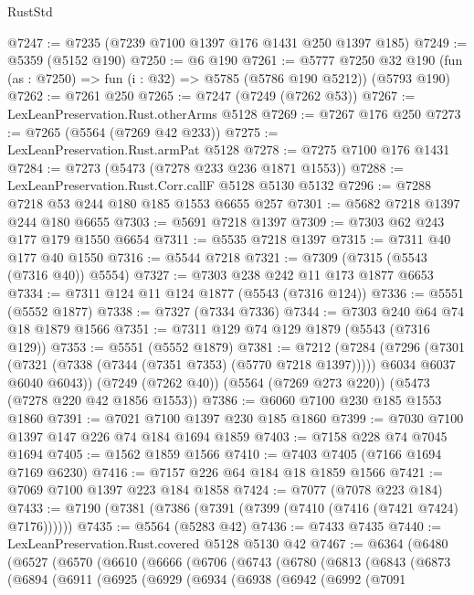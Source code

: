\begin{lexlean}{RustStd}
\begin{coremodule}
@7247 := @7235 (@7239 @7100 @1397 @176 @1431 @250 @1397 @185)
@7249 := @5359 (@5152 @190)
@7250 := @6 @190
@7261 := @5777
    @7250
    @32
    @190
    (fun (as : @7250) => fun (i : @32) => @5785 (@5786 @190 @5212))
    (@5793 @190)
@7262 := @7261 @250
@7265 := @7247 (@7249 (@7262 @53))
@7267 := LexLeanPreservation.Rust.otherArms @5128
@7269 := @7267 @176 @250
@7273 := @7265 (@5564 (@7269 @42 @233))
@7275 := LexLeanPreservation.Rust.armPat @5128
@7278 := @7275 @7100 @176 @1431
@7284 := @7273 (@5473 (@7278 @233 @236 @1871 @1553))
@7288 := LexLeanPreservation.Rust.Corr.callF @5128 @5130 @5132
@7296 := @7288 @7218 @53 @244 @180 @185 @1553 @6655 @257
@7301 := @5682 @7218 @1397 @244 @180 @6655
@7303 := @5691 @7218 @1397
@7309 := @7303 @62 @243 @177 @179 @1550 @6654
@7311 := @5535 @7218 @1397
@7315 := @7311 @40 @177 @40 @1550
@7316 := @5544 @7218
@7321 := @7309 (@7315 (@5543 (@7316 @40)) @5554)
@7327 := @7303 @238 @242 @11 @173 @1877 @6653
@7334 := @7311 @124 @11 @124 @1877 (@5543 (@7316 @124))
@7336 := @5551 (@5552 @1877)
@7338 := @7327 (@7334 @7336)
@7344 := @7303 @240 @64 @74 @18 @1879 @1566
@7351 := @7311 @129 @74 @129 @1879 (@5543 (@7316 @129))
@7353 := @5551 (@5552 @1879)
@7381 := @7212
    (@7284
      (@7296
        (@7301 (@7321 (@7338 (@7344 (@7351 @7353) (@5770 @7218 @1397)))))
        @6034
        @6037
        @6040
        @6043))
    (@7249 (@7262 @40))
    (@5564 (@7269 @273 @220))
    (@5473 (@7278 @220 @42 @1856 @1553))
@7386 := @6060 @7100 @230 @185 @1553 @1860
@7391 := @7021 @7100 @1397 @230 @185 @1860
@7399 := @7030 @7100 @1397 @147 @226 @74 @184 @1694 @1859
@7403 := @7158 @228 @74 @7045 @1694
@7405 := @1562 @1859 @1566
@7410 := @7403 @7405 (@7166 @1694 @7169 @6230)
@7416 := @7157 @226 @64 @184 @18 @1859 @1566
@7421 := @7069 @7100 @1397 @223 @184 @1858
@7424 := @7077 (@7078 @223 @184)
@7433 := @7190 (@7381 (@7386 (@7391 (@7399 (@7410 (@7416 (@7421 @7424) @7176))))))
@7435 := @5564 (@5283 @42)
@7436 := @7433 @7435
@7440 := LexLeanPreservation.Rust.covered @5128 @5130 @42
@7467 := @6364
    (@6480
      (@6527
        (@6570
          (@6610
            (@6666
              (@6706
                (@6743
                  (@6780
                    (@6813
                      (@6843
                        (@6873
                          (@6894
                            (@6911
                              (@6925
                                (@6929
                                  (@6934
                                    (@6938
                                      (@6942
                                        (@6992
                                          (@7091

\end{coremodule}
\end{lexlean}
